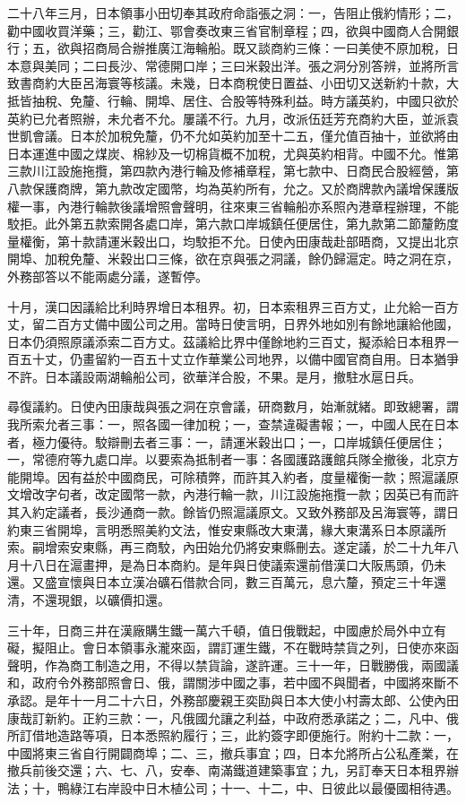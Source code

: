 \begin{pinyinscope}
二十八年三月，日本領事小田切奉其政府命詣張之洞：一，告阻止俄約情形；二，勸中國收買洋藥；三，勸江、鄂會奏改東三省官制章程；四，欲與中國商人合開銀行；五，欲與招商局合辦推廣江海輪船。既又談商約三條：一曰美使不原加稅，日本意與美同；二曰長沙、常德開口岸；三曰米穀出洋。張之洞分別答辨，並將所言致書商約大臣呂海寰等核議。未幾，日本商稅使日置益、小田切又送新約十款，大抵皆抽稅、免釐、行輪、開埠、居住、合股等特殊利益。時方議英約，中國只欲於英約已允者照辦，未允者不允。屢議不行。九月，改派伍廷芳充商約大臣，並派袁世凱會議。日本於加稅免釐，仍不允如英約加至十二五，僅允值百抽十，並欲將由日本運進中國之煤炭、棉紗及一切棉貨概不加稅，尤與英約相背。中國不允。惟第三款川江設施拖攬，第四款內港行輪及修補章程，第七款中、日商民合股經營，第八款保護商牌，第九款改定國幣，均為英約所有，允之。又於商牌款內議增保護版權一事，內港行輪款後議增照會聲明，往來東三省輪船亦系照內港章程辦理，不能駮拒。此外第五款索開各處口岸，第六款口岸城鎮任便居住，第九款第二節釐飭度量權衡，第十款請運米穀出口，均駮拒不允。日使內田康哉赴部晤商，又提出北京開埠、加稅免釐、米穀出口三條，欲在京與張之洞議，餘仍歸滬定。時之洞在京，外務部答以不能兩處分議，遂暫停。

十月，漢口因議給比利時界增日本租界。初，日本索租界三百方丈，止允給一百方丈，留二百方丈備中國公司之用。當時日使言明，日界外地如別有餘地讓給他國，日本仍須照原議添索二百方丈。茲議給比界中僅餘地約三百丈，擬添給日本租界一百五十丈，仍畫留約一百五十丈立作華業公司地界，以備中國官商自用。日本猶爭不許。日本議設兩湖輪船公司，欲華洋合股，不果。是月，撤駐水扈日兵。

尋復議約。日使內田康哉與張之洞在京會議，研商數月，始漸就緒。即致總署，謂我所索允者三事：一，照各國一律加稅；一，查禁違礙書報；一，中國人民在日本者，極力優待。駮辯刪去者三事：一，請運米穀出口；一，口岸城鎮任便居住；一，常德府等九處口岸。以要索為抵制者一事：各國護路護館兵隊全撤後，北京方能開埠。因有益於中國商民，可除積弊，而許其入約者，度量權衡一款；照滬議原文增改字句者，改定國幣一款，內港行輪一款，川江設施拖攬一款；因英已有而許其入約定議者，長沙通商一款。餘皆仍照滬議原文。又致外務部及呂海寰等，謂日約東三省開埠，言明悉照美約文法，惟安東縣改大東溝，緣大東溝系日本原議所索。嗣增索安東縣，再三商駮，內田始允仍將安東縣刪去。遂定議，於二十九年八月十八日在滬畫押，是為日本商約。是年與日使議索還前借漢口大阪馬頭，仍未還。又盛宣懷與日本立漢冶礦石借款合同，數三百萬元，息六釐，預定三十年還清，不還現銀，以礦價扣還。

三十年，日商三井在漢廠購生鐵一萬六千頓，值日俄戰起，中國慮於局外中立有礙，擬阻止。會日本領事永瀧來函，謂訂運生鐵，不在戰時禁貨之列，日使亦來函聲明，作為商工制造之用，不得以禁貨論，遂許運。三十一年，日戰勝俄，兩國議和，政府令外務部照會日、俄，謂關涉中國之事，若中國不與聞者，中國將來斷不承認。是年十一月二十六日，外務部慶親王奕劻與日本大使小村壽太郎、公使內田康哉訂新約。正約三款：一，凡俄國允讓之利益，中政府悉承諾之；二，凡中、俄所訂借地造路等項，日本悉照約履行；三，此約簽字即便施行。附約十二款：一，中國將東三省自行開闢商埠；二、三，撤兵事宜；四，日本允將所占公私產業，在撤兵前後交還；六、七、八，安奉、南滿鐵道建築事宜；九，另訂奉天日本租界辦法；十，鴨綠江右岸設中日木植公司；十一、十二，中、日彼此以最優國相待遇。


\end{pinyinscope}
